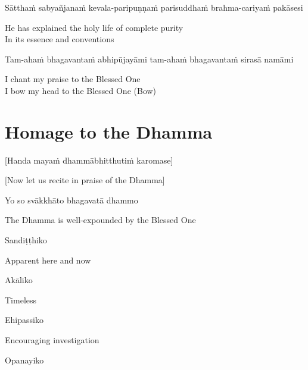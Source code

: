 Sātthaṁ sabyañjanaṁ kevala-paripuṇṇaṁ parisuddhaṁ brahma-cariyaṁ pakāsesi

\begin{cprenglish}
  He has explained the holy life of complete purity\\
  In its essence and conventions
\end{cprenglish}

Tam-ahaṁ bhagavantaṁ abhipūjayāmi tam-ahaṁ bhagavantaṁ sirasā namāmi
\begin{cprenglish}
  I chant my praise to the Blessed One\\
  I bow my head to the Blessed One \hfill{(Bow)}
\end{cprenglish}

\section{Homage to the Dhamma}
\label{homage-dhamma}

\begin{center}
  [Handa mayaṁ dhammābhitthutiṁ karomase]
\end{center}
\begin{center}
  [Now let us recite in praise of the Dhamma]
\end{center}

Yo so svākkhāto bhagavatā dhammo

\begin{cprenglish}
  The Dhamma is well-expounded by the Blessed One
\end{cprenglish}

Sandiṭṭhiko

\begin{cprenglish}
  Apparent here and now
\end{cprenglish}

Akāliko

\begin{cprenglish}
  Timeless
\end{cprenglish}

Ehipassiko

\begin{cprenglish}
  Encouraging investigation
\end{cprenglish}

Opanayiko

